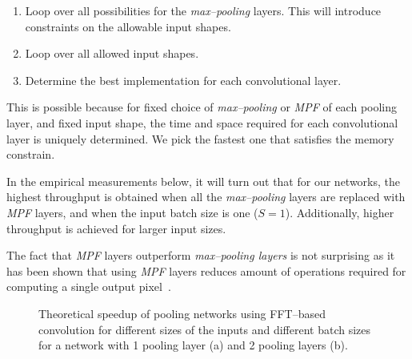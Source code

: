 \documentclass[conference]{./IEEEtran}
\begin{document}
  \begin{enumerate}
    \item Loop over all possibilities for the \emph{max--pooling}
      layers.  This will introduce constraints on the allowable input
      shapes.
    \item Loop over all allowed input shapes.
    \item Determine the best implementation for each convolutional
      layer.
  \end{enumerate}

  This is possible because for fixed choice of \emph{max--pooling} or
  \emph{MPF} of each pooling layer, and fixed input shape, the time
  and space required for each convolutional layer is uniquely
  determined.  We pick the fastest one that satisfies the memory
  constrain.

  In the empirical measurements below, it will turn out that for our
  networks, the highest throughput is obtained when all
  the \emph{max--pooling} layers are replaced with \emph{MPF} layers,
  and when the input batch size is one ($S = 1$).  Additionally,
  higher throughput is achieved for larger input sizes.

  The fact that \emph{MPF} layers outperform \emph{max--pooling
    layers} is not surprising as it has been shown that
    using \emph{MPF} layers reduces amount of operations required for
    computing a single output
    pixel~\cite{giusti2013fast,masci2013fast}.

  \begin{figure}
    \centering
    \caption{Theoretical speedup of pooling networks using FFT--based
      convolution for different sizes of the inputs and different
      batch sizes for a network with 1 pooling layer (a) and 2 pooling
      layers (b).}
    \label{fig:fftbatch}
  \end{figure}
\end{document}
